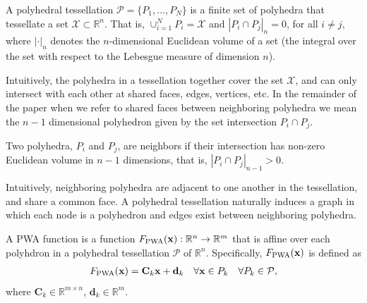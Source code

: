 \begin{definition}\label{def:tessellation}
A polyhedral tessellation $\mathcal{P} = \{P_1, \ldots, P_N\}$ is a finite set of polyhedra that tessellate a set $\mathcal{X} \subset \mathbb{R}^n$. That is, $\cup_{i = 1}^NP_i = \mathcal{X}$ and $|P_i\cap P_j|_n = 0$, for all $i \not= j$, where $|\cdot|_n$ denotes the $n$-dimensional Euclidean volume of a set (the integral over the set with respect to the Lebesgue measure of dimension $n$). 
\end{definition}

Intuitively, the polyhedra in a tessellation together cover the set $\mathcal{X}$, and can only intersect with each other at shared faces, edges, vertices, etc. 
In the remainder of the paper when we refer to shared faces between neighboring polyhedra we mean the $n-1$ dimensional polyhedron given by the set intersection $P_i \cap P_j$.

\begin{definition}
Two polyhedra, $P_i$ and $P_j$, are neighbors if their intersection has non-zero Euclidean volume in $n-1$ dimensions, that is, $|P_i \cap P_j|_{n-1} > 0$. 
\end{definition}

Intuitively, neighboring polyhedra are adjacent to one another in the tessellation, and share a common face. A polyhedral tessellation naturally induces a graph in which each node is a polyhedron and edges exist between neighboring polyhedra.

\begin{definition}  A PWA function is a function $F_{\text{PWA}}(\mathbf{x}) : \mathbb{R}^{n} \rightarrow \mathbb{R}^{m}$ that is affine over each polyhdron in a polyhedral tessellation $\mathcal{P}$ of $\mathbb{R}^n$.  Specifically, $F_{\text{PWA}}(\mathbf{x})$ is defined as
\begin{align}
    F_{\text{PWA}}(\mathbf{x}) = \mathbf{C}_k \mathbf{x} + \mathbf{d}_k \ \ \ \forall \mathbf{x} \in P_k \ \ \ \forall P_k \in \mathcal{P}, \label{eq:PWA}
\end{align}
where $\mathbf{C}_k \in \mathbb{R}^{m \times n}$, $\mathbf{d}_k \in \mathbb{R}^{m}$.
\end{definition}

